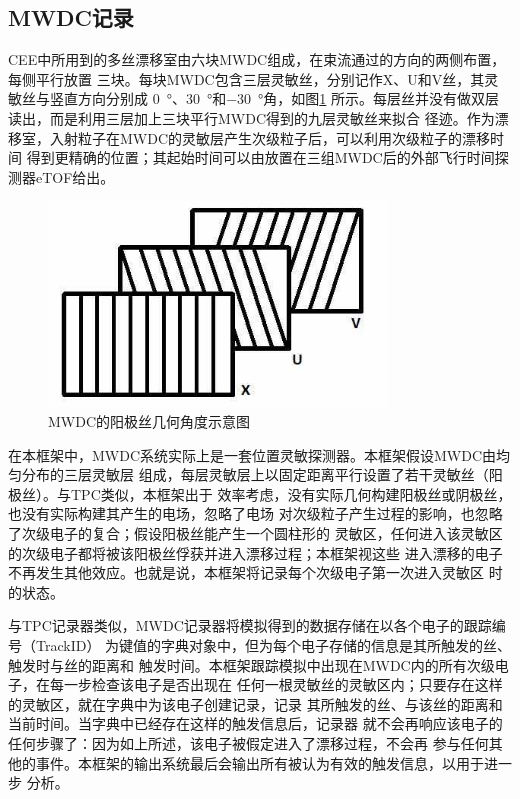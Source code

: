 \documentclass[bachelor,openany,oneside,color]{buaathesis}
\begin{document}
\subsection{MWDC记录}\label{ssec:digi:MWDC}

CEE中所用到的多丝漂移室由六块MWDC组成，在束流通过的方向的两侧布置，每侧平行放置
三块。每块MWDC包含三层灵敏丝，分别记作X、U和V丝，其灵敏丝与竖直方向分别成
\SI{0}{\degree}、\SI{30}{\degree}和\SI{-30}{\degree}角，如图\ref{fig:det:MWDC:Layer}
所示。每层丝并没有做双层读出，而是利用三层加上三块平行MWDC得到的九层灵敏丝来拟合
径迹。作为漂移室，入射粒子在MWDC的灵敏层产生次级粒子后，可以利用次级粒子的漂移时间
得到更精确的位置；其起始时间可以由放置在三组MWDC后的外部飞行时间探测器eTOF给出。

\begin{figure}
	\centering
	\includegraphics[width=0.8\textwidth]{./resource/CEE-MWDC-Layer.jpg}
	\caption{MWDC的阳极丝几何角度示意图}\label{fig:det:MWDC:Layer}
\end{figure}

在本框架中，MWDC系统实际上是一套位置灵敏探测器。本框架假设MWDC由均匀分布的三层灵敏层
组成，每层灵敏层上以固定距离平行设置了若干灵敏丝（阳极丝）。与TPC类似，本框架出于
效率考虑，没有实际几何构建阳极丝或阴极丝，也没有实际构建其产生的电场，忽略了电场
对次级粒子产生过程的影响，也忽略了次级电子的复合；假设阳极丝能产生一个圆柱形的
灵敏区，任何进入该灵敏区的次级电子都将被该阳极丝俘获并进入漂移过程；本框架视这些
进入漂移的电子不再发生其他效应。也就是说，本框架将记录每个次级电子第一次进入灵敏区
时的状态。

与TPC记录器类似，MWDC记录器将模拟得到的数据存储在以各个电子的跟踪编号（TrackID）
为键值的字典对象中，但为每个电子存储的信息是其所触发的丝、触发时与丝的距离和
触发时间。本框架跟踪模拟中出现在MWDC内的所有次级电子，在每一步检查该电子是否出现在
任何一根灵敏丝的灵敏区内；只要存在这样的灵敏区，就在字典中为该电子创建记录，记录
其所触发的丝、与该丝的距离和当前时间。当字典中已经存在这样的触发信息后，记录器
就不会再响应该电子的任何步骤了：因为如上所述，该电子被假定进入了漂移过程，不会再
参与任何其他的事件。本框架的输出系统最后会输出所有被认为有效的触发信息，以用于进一步
分析。
\end{document}
